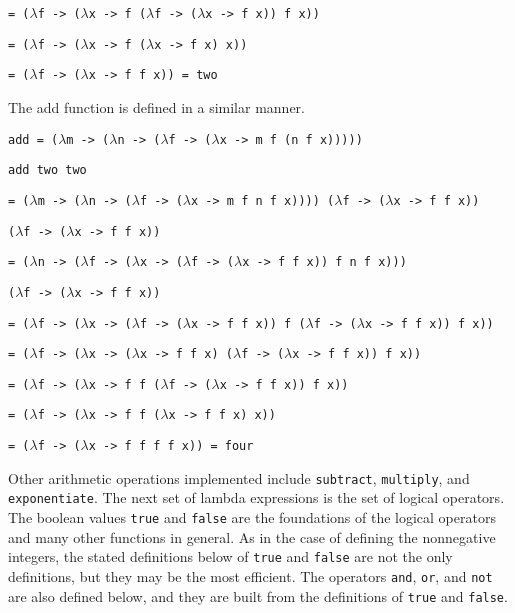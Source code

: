 \documentclass[11pt]{article}
\begin{document}
\hspace{2.5cm}\texttt{= ($\lambda$f -> ($\lambda$x -> f ($\lambda$f -> ($\lambda$x -> f x)) f x))}

\hspace{2.5cm}\texttt{= ($\lambda$f -> ($\lambda$x -> f ($\lambda$x -> f x) x))}

\hspace{2.5cm}\texttt{= ($\lambda$f -> ($\lambda$x -> f f x)) = two}

The add function is defined in a similar manner.

\hspace{2cm}\texttt{add = ($\lambda$m -> ($\lambda$n -> ($\lambda$f -> ($\lambda$x -> m f (n f x)))))}


\hspace{2cm}\texttt{add two two}

\hspace{2.5cm}\texttt{= ($\lambda$m -> ($\lambda$n -> ($\lambda$f -> ($\lambda$x -> m f n f x)))) ($\lambda$f -> ($\lambda$x -> f f x))}

\hspace{4cm}\texttt{($\lambda$f -> ($\lambda$x -> f f x))}

\hspace{2.5cm}\texttt{= ($\lambda$n -> ($\lambda$f -> ($\lambda$x -> ($\lambda$f -> ($\lambda$x -> f f x)) f n f x)))}

\hspace{4cm}\texttt{($\lambda$f -> ($\lambda$x -> f f x))}

\hspace{2.5cm}\texttt{= ($\lambda$f -> ($\lambda$x -> ($\lambda$f -> ($\lambda$x -> f f x)) f ($\lambda$f -> ($\lambda$x -> f f x)) f x))}

\hspace{2.5cm}\texttt{= ($\lambda$f -> ($\lambda$x -> ($\lambda$x -> f f x) ($\lambda$f -> ($\lambda$x -> f f x)) f x))}

\hspace{2.5cm}\texttt{= ($\lambda$f -> ($\lambda$x -> f f ($\lambda$f -> ($\lambda$x -> f f x)) f x))}

\hspace{2.5cm}\texttt{= ($\lambda$f -> ($\lambda$x -> f f ($\lambda$x -> f f x) x))}

\hspace{2.5cm}\texttt{= ($\lambda$f -> ($\lambda$x -> f f f f x)) = four}

Other arithmetic operations implemented include \texttt{subtract}, \texttt{multiply}, and \texttt{exponentiate}. The next set of lambda expressions is the set of logical operators. The boolean values \texttt{true} and \texttt{false} are the foundations of the logical operators and many other functions in general. As in the case of defining the nonnegative integers, the stated definitions below of \texttt{true} and \texttt{false} are not the only definitions, but they may be the most efficient. The operators \texttt{and}, \texttt{or}, and \texttt{not} are also defined below, and they are built from the definitions of \texttt{true} and \texttt{false}.
\end{document}

